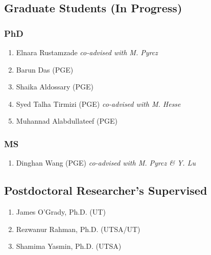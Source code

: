 \subsection*{Graduate Students (In Progress)}



\subsubsection*{PhD}
\begin{enumerate}
    \item Elnara Rustamzade \emph{co-advised with M. Pyrcz}
    \item Barun Das (PGE) 
    \item Shaika Aldossary (PGE) 
    \item Syed Talha Tirmizi (PGE)  \emph{co-advised with M. Hesse}
    \item Muhannad Alabdullateef (PGE)
\end{enumerate}

\subsubsection*{MS}
\begin{enumerate}
    \item Dinghan Wang (PGE) \emph{co-advised with M. Pyrcz \& Y. Lu}
\end{enumerate}

\subsection*{Postdoctoral Researcher's Supervised}
  \begin{enumerate}
      \item James O'Grady, Ph.D. (UT)
      \item Rezwanur Rahman, Ph.D. (UTSA/UT)
      \item Shamima Yasmin, Ph.D. (UTSA)
  \end{enumerate}

